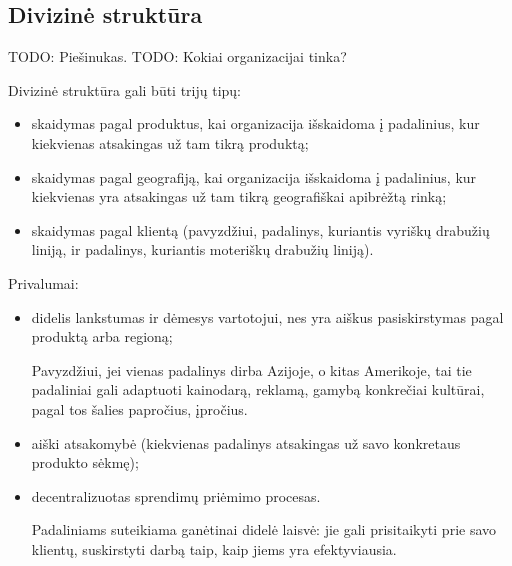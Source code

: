 \subsection{Divizinė struktūra}

TODO: Piešinukas.
TODO: Kokiai organizacijai tinka?

Divizinė struktūra gali būti trijų tipų:
\begin{itemize}
  \item skaidymas pagal produktus, kai organizacija išskaidoma į
    padalinius, kur kiekvienas atsakingas už tam tikrą produktą;
  \item skaidymas pagal geografiją, kai organizacija išskaidoma
    į padalinius, kur kiekvienas yra atsakingas už tam tikrą
    geografiškai apibrėžtą rinką;
  \item skaidymas pagal klientą (pavyzdžiui, padalinys, kuriantis
    vyriškų drabužių liniją, ir padalinys, kuriantis moteriškų drabužių
    liniją).
\end{itemize}

Privalumai:
\begin{itemize}
  \item didelis lankstumas ir dėmesys vartotojui, nes yra aiškus
    pasiskirstymas pagal produktą arba regioną;
    \begin{exmp}
      Pavyzdžiui, jei vienas padalinys dirba Azijoje, o kitas Amerikoje,
      tai tie padaliniai gali adaptuoti kainodarą, reklamą, gamybą
      konkrečiai kultūrai, pagal tos šalies papročius, įpročius.
    \end{exmp}
  \item aiški atsakomybė (kiekvienas padalinys atsakingas už savo
    konkretaus produkto sėkmę);
  \item decentralizuotas sprendimų priėmimo procesas.
    \begin{note}
      Padaliniams suteikiama ganėtinai didelė laisvė: jie gali
      prisitaikyti prie savo klientų, suskirstyti darbą taip, kaip
      jiems yra efektyviausia.
    \end{note}
\end{itemize}

